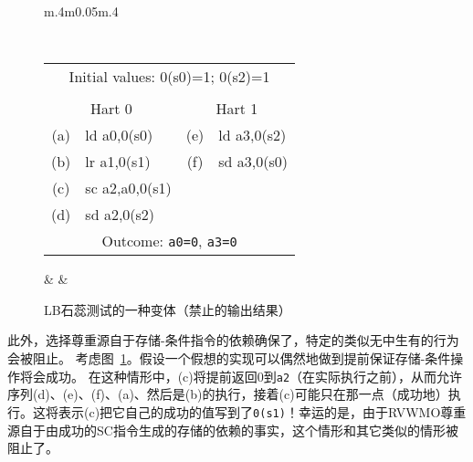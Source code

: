 \begin{figure}[h!]
  \centering
  \begin{tabular}{m{.4\linewidth}m{0.05\linewidth}m{.4\linewidth}}
  {
    \tt\small
    \begin{tabular}{cl||cl}
    \multicolumn{4}{c}{Initial values: 0(s0)=1; 0(s2)=1} \\
    \\
    \multicolumn{2}{c}{Hart 0} & \multicolumn{2}{c}{Hart 1} \\
    \hline
      (a) & ld a0,0(s0)    & (e) & ld a3,0(s2) \\
      (b) & lr a1,0(s1)    & (f) & sd a3,0(s0) \\
      (c) & sc a2,a0,0(s1) &                    \\
      (d) & sd a2,0(s2)    &                    \\
      \hline
      \multicolumn{4}{c}{Outcome: {\tt a0=0}, {\tt a3=0}}
    \end{tabular}
  }
  & &
  
  \end{tabular}
  \caption{LB石蕊测试的一种变体（禁止的输出结果）  
  }
  \label{fig:litmus:successdeps}
\end{figure}

此外，选择尊重源自于存储-条件指令的依赖确保了，特定的类似无中生有的行为会被阻止。
考虑图~\ref{fig:litmus:successdeps}。假设一个假想的实现可以偶然地做到提前保证存储-条件操作将会成功。
在这种情形中，(c)将提前返回0到{\tt a2}（在实际执行之前），从而允许序列(d)、(e)、(f)、(a)、然后是(b)的执行，接着(c)可能只在那一点（成功地）执行。这将表示(c)把它自己的成功的值写到了{\tt 0(s1)}！幸运的是，由于RVWMO尊重源自于由成功的SC指令生成的存储的依赖的事实，这个情形和其它类似的情形被阻止了。

